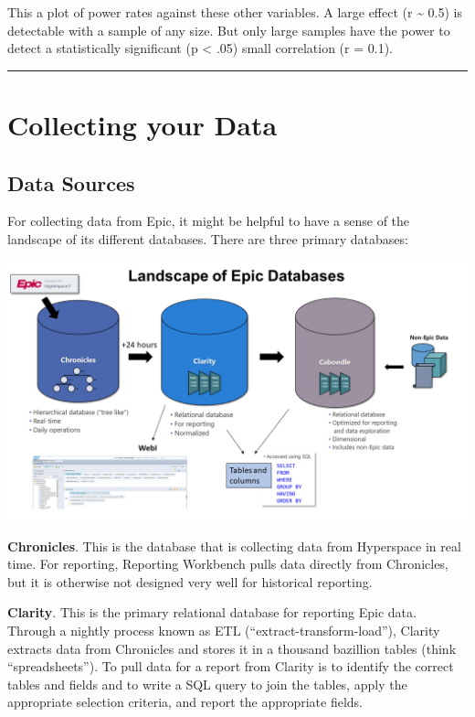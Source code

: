 \documentclass[
]{report}
\begin{document}
This a plot of power rates against these other variables. A large effect
(r \textasciitilde{} 0.5) is detectable with a sample of any size. But
only large samples have the power to detect a statistically significant
(p \textless{} .05) small correlation (r = 0.1).

\begin{center}\rule{0.5\linewidth}{0.5pt}\end{center}

\hypertarget{collecting-your-data}{%
\chapter{Collecting your Data}\label{collecting-your-data}}

\hypertarget{data-sources}{%
\section{Data Sources}\label{data-sources}}

For collecting data from Epic, it might be helpful to have a sense of
the landscape of its different databases. There are three primary
databases:

\includegraphics{EpicDataLandscape.png}

\textbf{Chronicles}. This is the database that is collecting data from
Hyperspace in real time. For reporting, Reporting Workbench pulls data
directly from Chronicles, but it is otherwise not designed very well for
historical reporting.

\textbf{Clarity}. This is the primary relational database for reporting
Epic data. Through a nightly process known as ETL
(``extract-transform-load''), Clarity extracts data from Chronicles and
stores it in a thousand bazillion tables (think ``spreadsheets''). To
pull data for a report from Clarity is to identify the correct tables
and fields and to write a SQL query to join the tables, apply the
appropriate selection criteria, and report the appropriate fields.
\end{document}
